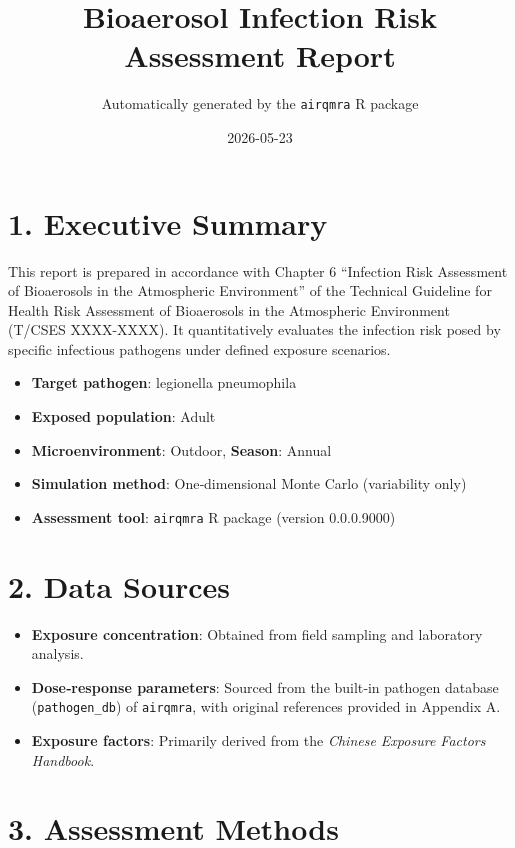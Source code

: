 \documentclass[
]{article}
\title{Bioaerosol Infection Risk Assessment Report}
\subtitle{Automatically generated by the \texttt{airqmra} R package}
\author{}
\date{\vspace{-2.5em}2026-05-23}
\providecommand{\tightlist}{%
  \setlength{\itemsep}{0pt}\setlength{\parskip}{0pt}}
\begin{document}
\maketitle

\section{1. Executive Summary}\label{executive-summary}

This report is prepared in accordance with Chapter 6 ``Infection Risk
Assessment of Bioaerosols in the Atmospheric Environment'' of the
Technical Guideline for Health Risk Assessment of Bioaerosols in the
Atmospheric Environment (T/CSES XXXX-XXXX). It quantitatively evaluates
the infection risk posed by specific infectious pathogens under defined
exposure scenarios.

\begin{itemize}
\tightlist
\item
  \textbf{Target pathogen}: legionella pneumophila
\item
  \textbf{Exposed population}: Adult
\item
  \textbf{Microenvironment}: Outdoor, \textbf{Season}: Annual
\item
  \textbf{Simulation method}: One‑dimensional Monte Carlo (variability
  only)
\item
  \textbf{Assessment tool}: \texttt{airqmra} R package (version
  0.0.0.9000)
\end{itemize}

\section{2. Data Sources}\label{data-sources}

\begin{itemize}
\tightlist
\item
  \textbf{Exposure concentration}: Obtained from field sampling and
  laboratory analysis.
\item
  \textbf{Dose‑response parameters}: Sourced from the built‑in pathogen
  database (\texttt{pathogen\_db}) of \texttt{airqmra}, with original
  references provided in Appendix A.
\item
  \textbf{Exposure factors}: Primarily derived from the \emph{Chinese
  Exposure Factors Handbook}.
\end{itemize}

\section{3. Assessment Methods}\label{assessment-methods}
\end{document}
